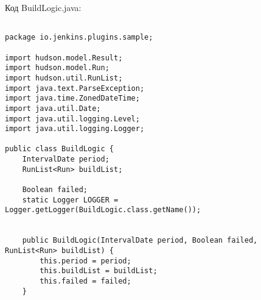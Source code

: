 \begin{lstlisting}[language=Java]
\end{lstlisting}

Код BuildLogic.java:

\begin{lstlisting}

package io.jenkins.plugins.sample;

import hudson.model.Result;
import hudson.model.Run;
import hudson.util.RunList;
import java.text.ParseException;
import java.time.ZonedDateTime;
import java.util.Date;
import java.util.logging.Level;
import java.util.logging.Logger;

public class BuildLogic {
    IntervalDate period;
    RunList<Run> buildList;

    Boolean failed;
    static Logger LOGGER = Logger.getLogger(BuildLogic.class.getName());


    public BuildLogic(IntervalDate period, Boolean failed, RunList<Run> buildList) {
        this.period = period;
        this.buildList = buildList;
        this.failed = failed;
    }


\end{lstlisting}
